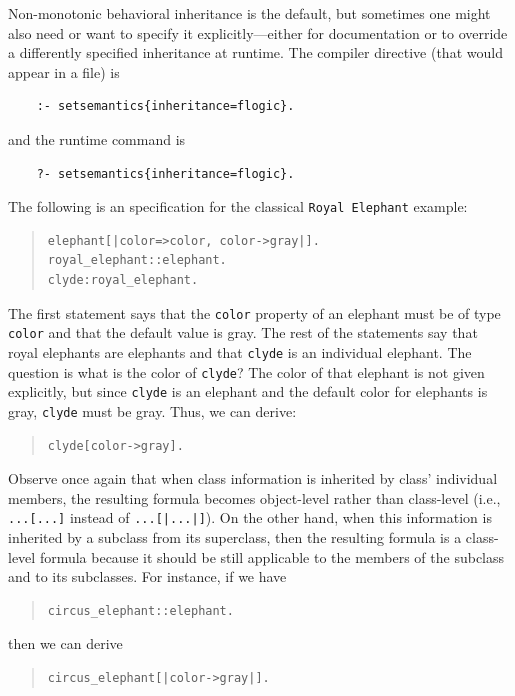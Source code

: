 \documentclass[11pt]{article}
\newcommand{\ERGO}{\mbox{\smaller{\ensuremath{\cal{E}}\smaller{{\sc{RGO}}}}}\xspace}
\newcommand{\FLSYSTEM}{\ERGO}
\begin{document}
Non-monotonic behavioral inheritance is the default, but sometimes one
might also need or want
to specify it explicitly---either for documentation or to override
a differently specified inheritance at runtime. The compiler directive
(that would appear in a file) is
\begin{verbatim}
    :- setsemantics{inheritance=flogic}.
\end{verbatim}
and the runtime command is
\begin{verbatim}
    ?- setsemantics{inheritance=flogic}.
\end{verbatim}
The following is an \FLSYSTEM specification
for the classical {\tt Royal Elephant} example:
\begin{quote}
\begin{verbatim}
elephant[|color=>color, color->gray|].
royal_elephant::elephant.
clyde:royal_elephant.
\end{verbatim}
\end{quote}
The first statement says that the \texttt{color} property of an elephant
must be of type \texttt{color} and that the default value is gray.  
The rest of the statements say that royal elephants are elephants and that
\texttt{clyde} is an individual elephant. 
The question is what is the color of {\tt clyde}? The color of that
elephant is not given explicitly, but since
{\tt clyde} is an elephant and the default color for elephants is gray,
{\tt clyde}
must be gray. Thus, we can derive:
\begin{quote}
\begin{verbatim}
clyde[color->gray].  
\end{verbatim}
\end{quote}
Observe once again that when class information is inherited by class'
individual members, the resulting formula becomes object-level rather than 
class-level (i.e., \texttt{...[...]} instead of \texttt{...[|...|]}).  
On the other
hand, when this information is inherited by a subclass from its superclass,
then the resulting formula is a class-level formula because it should be
still applicable to the members of the subclass and to its subclasses.
For instance, if we have
\begin{quote}
\begin{verbatim}
circus_elephant::elephant.
\end{verbatim}
\end{quote}
then we can derive 
\begin{quote}
\begin{verbatim}
circus_elephant[|color->gray|].  
\end{verbatim}
\end{quote}
\end{document}

